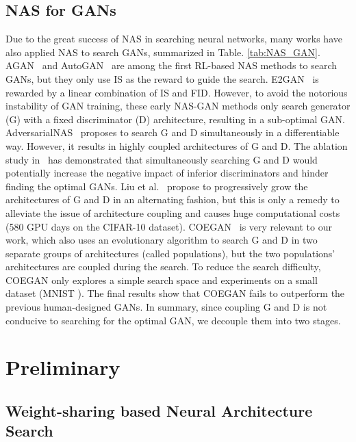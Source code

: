 \documentclass[runningheads]{llncs}
\begin{document}
\subsection{NAS for GANs}\label{sec:nas_gan}


Due to the great success of NAS in searching neural networks, many works have also applied NAS to search GANs, summarized in Table. \ref{tab:NAS_GAN}. AGAN~\cite{agan} and AutoGAN~\cite{autoGAN} are among the first RL-based NAS methods to search GANs, but they only use IS as the reward to guide the search. E2GAN~\cite{offgan} is rewarded by a linear combination of IS and FID. However, to avoid the notorious instability of GAN training, these early NAS-GAN methods only search generator (G) with a fixed discriminator (D) architecture, resulting in a sub-optimal GAN. AdversarialNAS~\cite{Adversarialnas} proposes to search G and D simultaneously in a differentiable way. However, it results in highly coupled architectures of G and D. The ablation study in~\cite{AlphaGAN} has demonstrated that simultaneously searching G and D would potentially increase the negative impact of inferior discriminators and hinder finding the optimal GANs. Liu et al.~\cite{dggan} propose to progressively grow the architectures of G and D in an alternating fashion, but this is only a remedy to alleviate the issue of architecture coupling and causes huge computational costs (580 GPU days on the CIFAR-10 \cite{cifar10} dataset).  COEGAN~\cite{costa2019coevolution} is very relevant to our work, which also uses an evolutionary algorithm to search G and D in two separate groups of architectures (called populations), but the two populations' architectures are coupled during the search. To reduce the search difficulty, COEGAN only explores a simple search space and experiments on a small dataset (MNIST \cite{mnist}). The final results show that COEGAN fails to outperform the previous human-designed GANs. In summary, since coupling G and D is not conducive to searching for the optimal GAN, we decouple them into two stages.







\section{Preliminary}

\subsection{Weight-sharing based Neural Architecture Search}
\end{document}
